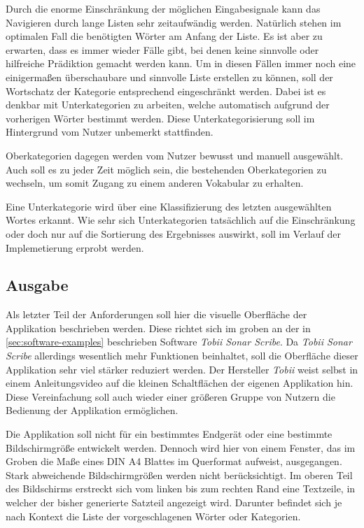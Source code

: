         Durch die enorme Einschränkung der möglichen Eingabesignale kann das Navigieren durch lange Listen sehr zeitaufwändig werden. Natürlich stehen im optimalen Fall die benötigten Wörter am Anfang der Liste. Es ist aber zu erwarten, dass es immer wieder Fälle gibt, bei denen keine sinnvolle oder hilfreiche Prädiktion gemacht werden kann. Um in diesen Fällen immer noch eine einigermaßen überschaubare und sinnvolle Liste erstellen zu können, soll der Wortschatz der Kategorie entsprechend eingeschränkt werden. Dabei ist es denkbar mit Unterkategorien zu arbeiten, welche automatisch aufgrund der vorherigen Wörter bestimmt werden. Diese Unterkategorisierung soll im Hintergrund vom Nutzer unbemerkt stattfinden. 
        
        Oberkategorien dagegen werden vom Nutzer bewusst und manuell ausgewählt. Auch soll es zu jeder Zeit möglich sein, die bestehenden Oberkategorien zu wechseln, um somit Zugang zu einem anderen Vokabular zu erhalten.
        
        Eine Unterkategorie wird über eine Klassifizierung des letzten ausgewählten Wortes erkannt. Wie sehr sich Unterkategorien tatsächlich auf die Einschränkung oder doch nur auf die Sortierung des Ergebnisses auswirkt, soll im Verlauf der Implemetierung erprobt werden. 
        
        
    \newpage
	\subsection{Ausgabe}
        
        Als letzter Teil der Anforderungen soll hier die visuelle Oberfläche der Applikation beschrieben werden. Diese richtet sich im groben an der in \autoref{sec:software-examples} beschrieben Software \emph{Tobii Sonar Scribe}. Da \emph{Tobii Sonar Scribe} allerdings wesentlich mehr Funktionen beinhaltet, soll die Oberfläche dieser Applikation sehr viel stärker reduziert werden. Der Hersteller \emph{Tobii} weist selbst in einem Anleitungsvideo auf die kleinen Schaltflächen der eigenen Applikation hin. \parencite[min. 0:53]{tobii:sonoScribeVideo} Diese Vereinfachung soll auch wieder einer größeren Gruppe von Nutzern die Bedienung der Applikation ermöglichen.
        
        Die Applikation soll nicht für ein bestimmtes Endgerät oder eine bestimmte Bildschirmgröße entwickelt werden. Dennoch wird hier von einem Fenster, das im Groben die Maße eines DIN A4 Blattes im Querformat aufweist, ausgegangen. Stark abweichende Bildschirmgrößen werden nicht berücksichtigt. Im oberen Teil des Bildschirms erstreckt sich vom linken bis zum rechten Rand eine Textzeile, in welcher der bisher generierte Satzteil angezeigt wird. Darunter befindet sich je nach Kontext die Liste der vorgeschlagenen Wörter oder Kategorien.
        
